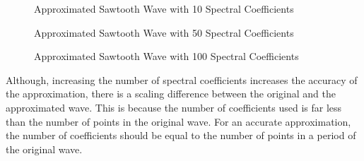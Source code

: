 \documentclass[10pt,a4paper, margin=1in]{article}
\begin{document}
\begin{enumerate}
\begin{enumerate}
\begin{figure}[H]
        \caption{Approximated Sawtooth Wave with 10 Spectral Coefficients}
        
    \end{figure}
    \begin{figure}[H]
        \centering
        \caption{Approximated Sawtooth Wave with 50 Spectral Coefficients}
        
    \end{figure}
    \begin{figure}[H]
        \centering
        \caption{Approximated Sawtooth Wave with 100 Spectral Coefficients}
        
    \end{figure}
    Although, increasing the number of spectral coefficients increases the accuracy of the approximation, there is a scaling difference between the original and the approximated wave. This is because the number of coefficients used is far less than the number of points in the original wave. For an accurate approximation, the number of coefficients should be equal to the number of points in a period of the original wave.
\end{enumerate}
\end{enumerate}
\end{document}
